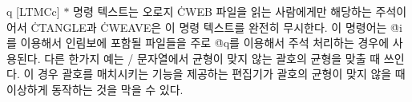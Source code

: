 \@{q} [LTMCc] $*$ 명령 텍스트는 오로지
\.{CWEB} 파일을 읽는 사람에게만 해당하는 주석이어서 \.{CTANGLE}과
\.{CWEAVE}은 이 명령 텍스트를 완전히 무시한다.
이 명령어는 \.{@i}를 이용해서 인림보에 포함될 파일들을 주로 \.{@q}를
이용해서 주석 처리하는 경우에 사용된다. 다른 한가지 예는 \CEE/
문자열에서 균형이 맞지 않는 괄호의 균형을 맞출 때 쓰인다. 이 경우 괄호를
매치시키는 기능을 제공하는 편집기가 괄호의 균형이 맞지 않을 때 이상하게
동작하는 것을 막을 수 있다. 
 
